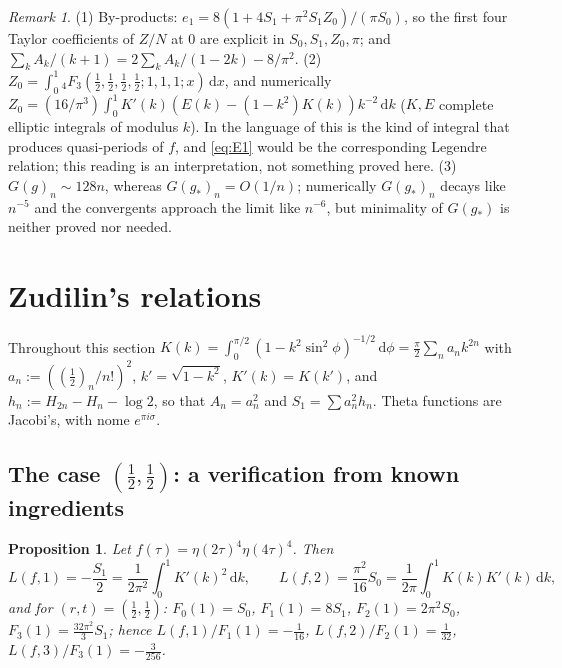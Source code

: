 \documentclass[11pt]{amsart}
\newtheorem{proposition}[theorem]{Proposition}
\theoremstyle{definition}
\theoremstyle{remark}
\newtheorem{remark}[theorem]{Remark}
\numberwithin{equation}{section}
\newcommand{\dd}{\,\mathrm{d}}
\begin{document}
\begin{remark}\label{rem:Z0}
(1) By-products: $e_1=8(1+4S_1+\pi^2S_1Z_0)/(\pi S_0)$, so the first four Taylor coefficients of $Z/N$ at $0$ are explicit in $S_0,S_1,Z_0,\pi$; and $\sum_kA_k/(k+1)=2\sum_kA_k/(1-2k)-8/\pi^2$.
(2) $Z_0=\int_0^1{}_4F_3(\frac12,\frac12,\frac12,\frac12;1,1,1;x)\dd x$, and numerically $Z_0=(16/\pi^3)\int_0^1K'(k)(E(k)-(1-k^2)K(k))k^{-2}\dd k$ ($K,E$ complete elliptic integrals of modulus $k$). In the language of \cite[\S4]{BKSZ} this is the kind of integral that produces quasi-periods of $f$, and \eqref{eq:E1} would be the corresponding Legendre relation; this reading is an interpretation, not something proved here.
(3) $G(g)_n\sim128n$, whereas $G(g_*)_n=O(1/n)$; numerically $G(g_*)_n$ decays like $n^{-5}$ and the convergents approach the limit like $n^{-6}$, but minimality of $G(g_*)$ is neither proved nor needed.
\end{remark}

\section{Zudilin's relations}\label{sec:Z}

Throughout this section $K(k)=\int_0^{\pi/2}(1-k^2\sin^2\phi)^{-1/2}\dd\phi=\frac\pi2\sum_na_nk^{2n}$ with $a_n:=((\frac12)_n/n!)^2$, $k'=\sqrt{1-k^2}$, $K'(k)=K(k')$, and $h_n:=H_{2n}-H_n-\log2$, so that $A_n=a_n^2$ and $S_1=\sum a_n^2h_n$. Theta functions are Jacobi's, with nome $e^{\pi i\sigma}$.

\subsection{\texorpdfstring{The case $(\frac12,\frac12)$: a verification from known ingredients}{The case (1/2,1/2): a verification from known ingredients}}
\begin{proposition}\label{prop:Z}
Let $f(\tau)=\eta(2\tau)^4\eta(4\tau)^4$. Then
\[
L(f,1)=-\frac{S_1}2=\frac1{2\pi^2}\int_0^1K'(k)^2\dd k,\qquad L(f,2)=\frac{\pi^2}{16}S_0=\frac1{2\pi}\int_0^1K(k)K'(k)\dd k,
\]
and for $(r,t)=(\frac12,\frac12)$: $F_0(1)=S_0$, $F_1(1)=8S_1$, $F_2(1)=2\pi^2S_0$, $F_3(1)=\frac{32\pi^2}3S_1$; hence $L(f,1)/F_1(1)=-\frac1{16}$, $L(f,2)/F_2(1)=\frac1{32}$, $L(f,3)/F_3(1)=-\frac3{256}$.
\end{proposition}
\end{document}
